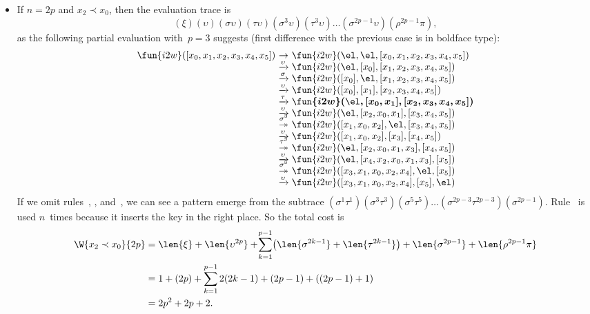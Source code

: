 \begin{itemize}
  \item If \(n = 2p\) and \(x_2 \prec x_0\), then the evaluation trace is
    \begin{equation*}
      (\xi)(\upsilon)(\sigma\upsilon)(\tau\upsilon)
      (\sigma^3\upsilon)(\tau^3\upsilon)
      \ldots (\sigma^{2p-1}\upsilon)(\rho^{2p-1}\pi),
    \end{equation*}
    as the following partial evaluation with~\(p=3\) suggests (first
    difference with the previous case is in boldface type):
\begin{equation*}
\begin{array}{@{}r@{\;}c@{\;}l@{}}
\fun{i2w}([x_{0},x_{1},x_{2},x_{3},x_{4},x_{5}])
& \rightarrow
& \fun{i2w}(\el,\el,[x_{0},x_{1},x_{2},x_{3},x_{4},x_{5}])\\
& \xrightarrow{\smash{\upsilon}}
& \fun{i2w}(\el,[x_{0}],[x_{1},x_{2},x_{3},x_{4},x_{5}])\\
& \xrightarrow{\smash{\sigma}}
& \fun{i2w}([x_{0}],\el,[x_{1},x_{2},x_{3},x_{4},x_{5}])\\
& \xrightarrow{\smash{\upsilon}}
& \fun{i2w}([x_{0}],[x_{1}],[x_{2},x_{3},x_{4},x_{5}])\\
& \xrightarrow{\smash{\tau}}
& \boldsymbol{\fun{i2w}(\el,[x_{0},x_{1}],[x_{2},x_{3},x_{4},x_{5}])}\\
& \xrightarrow{\smash{\upsilon}}
& \fun{i2w}(\el,[x_{2},x_{0},x_{1}],[x_{3},x_{4},x_{5}])\\
& \stackrel{\smash{\sigma^{\smash{3}}}}{\twoheadrightarrow}
& \fun{i2w}([x_{1},x_{0},x_{2}],\el,[x_{3},x_{4},x_{5}])\\
& \xrightarrow{\smash{\upsilon}}
& \fun{i2w}([x_{1},x_{0},x_{2}],[x_{3}],[x_{4},x_{5}])\\
& \stackrel{\smash{\tau^{\smash{3}}}}{\twoheadrightarrow}
& \fun{i2w}(\el,[x_{2},x_{0},x_{1},x_{3}],[x_{4},x_{5}])\\
& \xrightarrow{\smash{\upsilon}}
& \fun{i2w}(\el,[x_{4},x_{2},x_{0},x_{1},x_{3}],[x_{5}])\\
& \stackrel{\smash{\sigma^{\smash{5}}}}{\twoheadrightarrow}
& \fun{i2w}([x_{3},x_{1},x_{0},x_{2},x_{4}],\el,[x_{5}])\\
& \xrightarrow{\smash{\upsilon}}
& \fun{i2w}([x_{3},x_{1},x_{0},x_{2},x_{4}],[x_{5}],\el)
\end{array}
\end{equation*}
If we omit rules~\clause{\xi}, \clause{\upsilon}, \clause{\pi}
and~\clause{\rho}, we can see a pattern emerge from the subtrace
\((\sigma^1\tau^1)(\sigma^3\tau^3)(\sigma^5\tau^5) \ldots
(\sigma^{2p-3}\tau^{2p-3})(\sigma^{2p-1})\). Rule~\clause{\upsilon} is
used \(n\)~times because it inserts the key in the right place. So the
total cost is
\begin{align*}
\W{x_2 \prec x_0}{2p}
   &= \len{\xi} + \len{\upsilon^{2p}}
           + \!\sum_{k=1}^{p-1}{\!\left(\len{\sigma^{2k-1}} + \len{\tau^{2k-1}}\right)}
           + \len{\sigma^{2p-1}} + \len{\rho^{2p-1}\pi}\\
   &= 1 + (2p) + \sum_{k=1}^{p-1}{2(2k-1)} + (2p-1) + ((2p - 1) + 1)\\
   &= 2p^2 + 2p + 2.
\end{align*}
\end{itemize}
